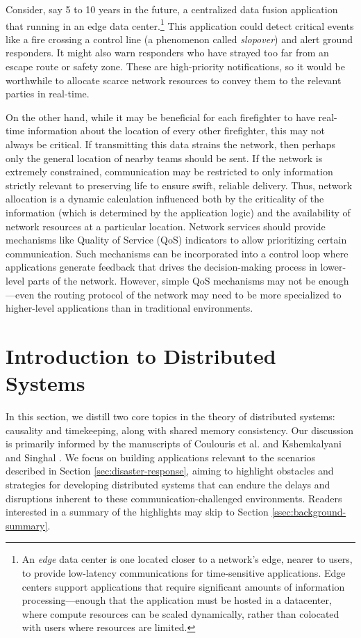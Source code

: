 \documentclass[]             %
{NASA}                       %
\theoremstyle{definition}
\begin{document}
Consider, say 5 to 10 years in the future, a centralized data fusion
application that running in an edge data center.\footnote{An
  \emph{edge} data center is one located closer to a network's edge,
  nearer to users, to provide low-latency communications for
  time-sensitive applications. Edge centers support applications that
  require significant amounts of information processing---enough that
  the application must be hosted in a datacenter, where compute
  resources can be scaled dynamically, rather than colocated with
  users where resources are limited.} This application could detect
critical events like a fire crossing a control line (a phenomenon
called \emph{slopover}) and alert ground responders. It might also
warn responders who have strayed too far from an escape route or
safety zone. These are high-priority notifications, so it would be
worthwhile to allocate scarce network resources to convey them to the
relevant parties in real-time.

On the other hand, while it may be beneficial for each firefighter to
have real-time information about the location of every other
firefighter, this may not always be critical. If transmitting this
data strains the network, then perhaps only the general location of
nearby teams should be sent. If the network is extremely constrained,
communication may be restricted to only information strictly relevant
to preserving life to ensure swift, reliable delivery. Thus, network
allocation is a dynamic calculation influenced both by the criticality
of the information (which is determined by the application logic) and
the availability of network resources at a particular
location. Network services should provide mechanisms like Quality of
Service (QoS) indicators to allow prioritizing certain
communication. Such mechanisms can be incorporated into a control loop
where applications generate feedback that drives the decision-making
process in lower-level parts of the network. However, simple QoS
mechanisms may not be enough---even the routing protocol of the
network may need to be more specialized to higher-level applications
than in traditional environments.


\section{Introduction to Distributed Systems}
\label{sec:background}
In this section, we distill two core topics in the theory of
distributed systems: causality and timekeeping, along with shared
memory consistency.  Our discussion is primarily informed by the
manuscripts of Coulouris et al.  \cite{coulouris2005distributed} and
Kshemkalyani and Singhal \cite{kshemkalyani_singhal_2008}. We focus on
building applications relevant to the scenarios described in Section
\ref{sec:disaster-response}, aiming to highlight obstacles and
strategies for developing distributed systems that can endure the
delays and disruptions inherent to these communication-challenged
environments. Readers interested in a summary of the highlights may
skip to Section \ref{ssec:background-summary}.
\end{document}

